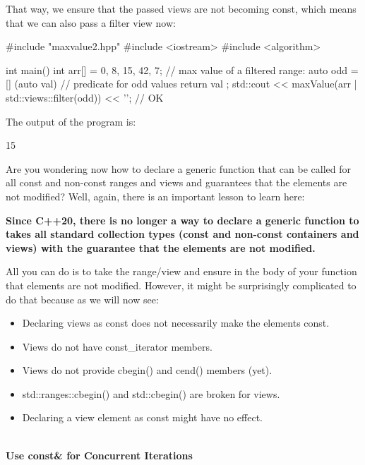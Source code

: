 That way, we ensure that the passed views are not becoming const, which means that we can also pass a filter view now:


\begin{cpp}
#include "maxvalue2.hpp"
#include <iostream>
#include <algorithm>

int main()
{
	int arr[] = {0, 8, 15, 42, 7};
	// max value of a filtered range:
	auto odd = [] (auto val) { // predicate for odd values
				return val %
			};
	std::cout << maxValue(arr | std::views::filter(odd)) << '\n'; // OK
}
\end{cpp}

The output of the program is:

{\footnotesize
\begin{shell}
15
\end{shell}
}

Are you wondering now how to declare a generic function that can be called for all const and non-const ranges and views and guarantees that the elements are not modified? Well, again, there is an important lesson to learn here:

\textbf{Since C++20, there is no longer a way to declare a generic function to takes all standard collection types (const and non-const containers and views) with the guarantee that the elements are not modified.}

All you can do is to take the range/view and ensure in the body of your function that elements are not modified. However, it might be surprisingly complicated to do that because as we will now see:

\begin{itemize}
\item
Declaring views as const does not necessarily make the elements const.

\item
Views do not have const\_iterator members.

\item
Views do not provide cbegin() and cend() members (yet).

\item
std::ranges::cbegin() and std::cbegin() are broken for views.

\item
Declaring a view element as const might have no effect.
\end{itemize}

\noindent
\hspace*{\fill} \\ %
\textbf{Use const\& for Concurrent Iterations}

